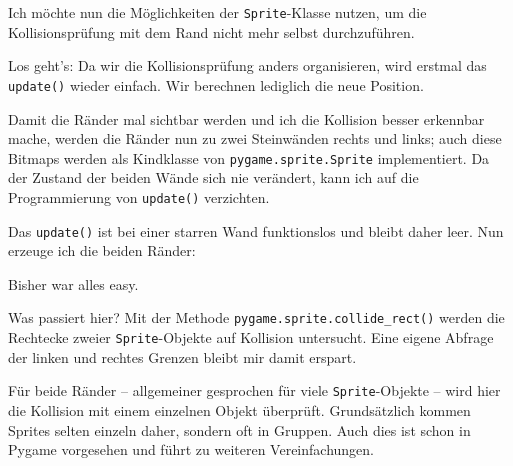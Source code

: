 Ich möchte nun die Möglichkeiten der \texttt{Sprite}-Klasse nutzen, um die Kollisionsprüfung mit dem Rand nicht mehr selbst durchzuführen. 


Los geht's: Da wir die Kollisionsprüfung anders organisieren, wird erstmal das \texttt{update()} wieder einfach. Wir berechnen lediglich die neue Position. 




Damit die Ränder mal sichtbar werden und ich die Kollision besser erkennbar mache, werden die Ränder nun zu zwei Steinwänden rechts und links; auch diese Bitmaps werden als Kindklasse von \texttt{pygame.sprite.Sprite} implementiert. Da der Zustand der beiden Wände sich nie verändert, kann ich auf die Programmierung von \texttt{update()} verzichten.


Das \texttt{update()} ist bei einer starren Wand funktionslos und bleibt daher leer. Nun erzeuge ich die beiden Ränder:


Bisher war alles easy. 


Was passiert hier? Mit der Methode \texttt{pygame.sprite.collide\_rect()} werden die Rechtecke zweier \texttt{Sprite}-Objekte auf Kollision untersucht. Eine eigene Abfrage der linken und rechtes Grenzen bleibt mir damit erspart.

Für beide Ränder -- allgemeiner gesprochen für viele \texttt{Sprite}-Objekte -- wird hier die Kollision mit einem einzelnen Objekt überprüft. Grundsätzlich kommen Sprites selten einzeln daher, sondern oft in Gruppen. Auch dies ist schon in Pygame vorgesehen und führt zu weiteren Vereinfachungen.

